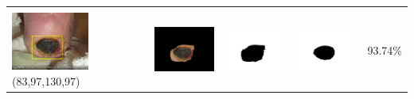 \begin{table}[H]
\begin{tabular}{|m{1.0in}|m{1.0in}|m{1.0in}|m{1.0in}|m{0.6in}|}
		&  &  & \\
		\includegraphics[width=1.0in]{gambar/hasil_segmentasi/luka_hitam/image_6_rect.jpg} {\centering\fontsize{10}{10}\selectfont(83,97,130,97)}&
		\includegraphics[width=1.0in]{gambar/hasil_segmentasi/luka_hitam/result_6.jpg}&
		\includegraphics[width=1.0in]{gambar/hasil_segmentasi/luka_hitam/mask_r_6.jpg}&
		\includegraphics[width=1.0in]{gambar/hasil_segmentasi/luka_hitam/6_r.jpg}&
		93.74\% \\
		\hline
		
	\end{tabular}
\end{table}

